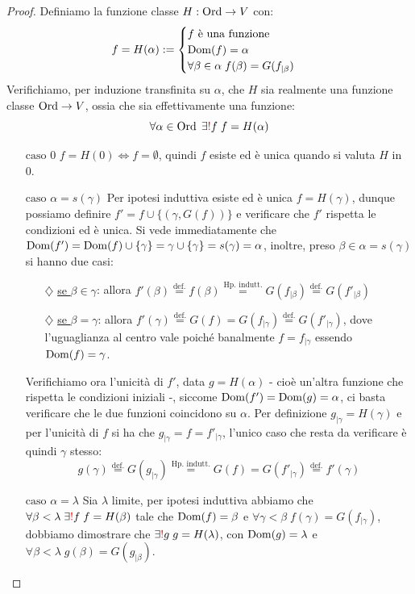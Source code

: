 \begin{proof}
	Definiamo la funzione classe $H : \operatorname{Ord} \to V$ con:
	\[ f = H(\alpha) := \begin{cases}
		\text{$f$ è una funzione} \\
		\operatorname{Dom}(f) = \alpha \\
		\forall \beta \in \alpha \; f(\beta) = G(f_{|\beta})
	\end{cases}
		\]
	Verifichiamo, per induzione  transfinita su $\alpha$, che $H$ sia realmente una funzione classe $\operatorname{Ord} \to V$, ossia che sia effettivamente una funzione:
	\[ \forall \alpha \in \operatorname{Ord} \; \exists\textcolor{red}{!}f \; f = H(\alpha)
		\]
	\begin{itemize}
		\item[$\boxed{\text{caso 0}}$] $f = H(0) \iff f = \emptyset$, quindi $f$ esiste ed è unica quando si valuta $H$ in 0.
		\item[$\boxed{\text{caso $\alpha = s(\gamma)$}}$] Per ipotesi induttiva esiste ed è unica $f = H(\gamma)$, dunque possiamo definire $f' = f \cup \{(\gamma,G(f))\}$ e verificare che $f'$ rispetta le condizioni ed è unica.
		Si vede immediatamente che $\operatorname{Dom}(f') = \operatorname{Dom}(f) \cup \{\gamma\} = \gamma \cup \{\gamma\} = s(\gamma) = \alpha$, inoltre, preso $\beta \in \alpha = s(\gamma)$ si hanno due casi:
		\begin{itemize}
			\item[$\diamondsuit$] \underline{se $\beta \in \gamma$}: allora $f'(\beta) \overset{\text{def.}}{=} f(\beta) \overset{\text{Hp. indutt.}}{=} G(f_{|\beta}) \overset{\text{def.}}{=} G(f'_{|\beta})$
			\item[$\diamondsuit$] \underline{se $\beta = \gamma$}: allora $f'(\gamma) \overset{\text{def.}}{=} G(f) = G(f_{|\gamma}) \overset{\text{def.}}{=} G(f'_{|\gamma})$, dove l'uguaglianza al centro vale poiché banalmente $f = f_{|\gamma}$ essendo $\operatorname{Dom}(f) = \gamma$.
		\end{itemize}
		Verifichiamo ora l'unicità di $f'$, data $g = H(\alpha)$ - cioè un'altra funzione che rispetta le condizioni iniziali -, siccome $\operatorname{Dom}(f') = \operatorname{Dom}(g) = \alpha$, ci basta verificare che le due funzioni coincidono su $\alpha$.
		Per definizione $g_{|\gamma} = H(\gamma)$ e per l'unicità di $f$ si ha che $g_{|\gamma} = f = f'_{|\gamma}$, l'unico caso che resta da verificare è quindi $\gamma$ stesso:
		\[  g(\gamma) \overset{\text{def.}}{=} G(g_{|\gamma}) \overset{\text{Hp. indutt.}}{=} G(f) = G(f'_{|\gamma}) \overset{\text{def.}}{=} f'(\gamma)
			\]
		\item[$\boxed{\text{caso $\alpha = \lambda$}}$] Sia $\lambda$ limite, per ipotesi induttiva abbiamo che $\forall \beta < \lambda \;\exists\textcolor{red}{!}f \; f = H(\beta)$ tale che $\operatorname{Dom}(f) = \beta$ e $\forall \gamma < \beta \; f(\gamma) = G(f_{|\gamma})$, dobbiamo dimostrare che $\exists\textcolor{red}{!}g \; g = H(\lambda)$, con $\operatorname{Dom}(g) = \lambda$ e $\forall \beta < \lambda \; g(\beta) = G(g_{|\beta})$.\\

\end{itemize}
\end{proof}
